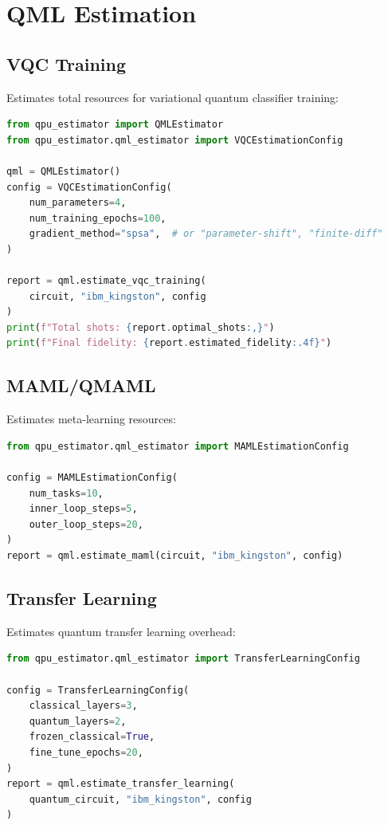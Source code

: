 \documentclass[11pt,a4paper]{article}
\begin{document}
\section{QML Estimation}

\subsection{VQC Training}

Estimates total resources for variational quantum classifier training:

\begin{lstlisting}[language=Python,caption=VQC Training Estimation]
from qpu_estimator import QMLEstimator
from qpu_estimator.qml_estimator import VQCEstimationConfig

qml = QMLEstimator()
config = VQCEstimationConfig(
    num_parameters=4,
    num_training_epochs=100,
    gradient_method="spsa",  # or "parameter-shift", "finite-diff"
)

report = qml.estimate_vqc_training(
    circuit, "ibm_kingston", config
)
print(f"Total shots: {report.optimal_shots:,}")
print(f"Final fidelity: {report.estimated_fidelity:.4f}")
\end{lstlisting}

\subsection{MAML/QMAML}

Estimates meta-learning resources:

\begin{lstlisting}[language=Python,caption=MAML Estimation]
from qpu_estimator.qml_estimator import MAMLEstimationConfig

config = MAMLEstimationConfig(
    num_tasks=10,
    inner_loop_steps=5,
    outer_loop_steps=20,
)
report = qml.estimate_maml(circuit, "ibm_kingston", config)
\end{lstlisting}

\subsection{Transfer Learning}

Estimates quantum transfer learning overhead:

\begin{lstlisting}[language=Python,caption=Transfer Learning Estimation]
from qpu_estimator.qml_estimator import TransferLearningConfig

config = TransferLearningConfig(
    classical_layers=3,
    quantum_layers=2,
    frozen_classical=True,
    fine_tune_epochs=20,
)
report = qml.estimate_transfer_learning(
    quantum_circuit, "ibm_kingston", config
)
\end{lstlisting}
\end{document}
